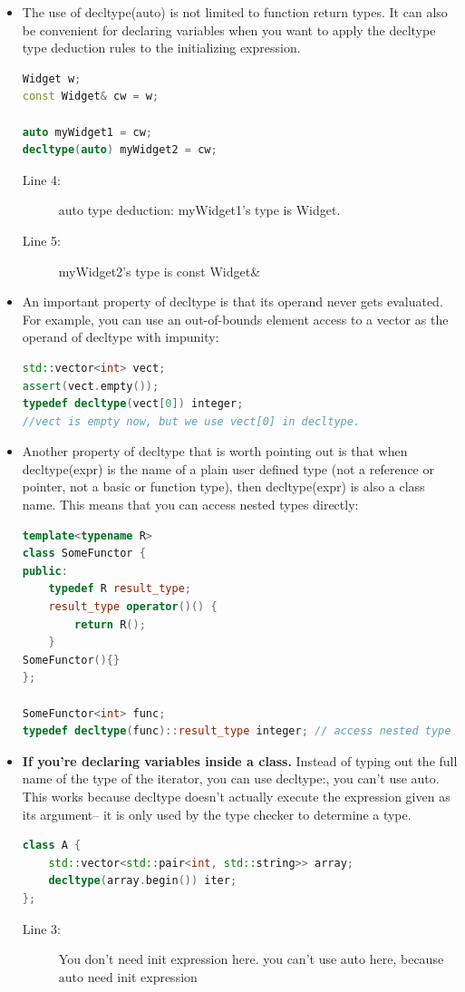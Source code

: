 \documentclass[a4paper,11pt,twoside]{book}
\begin{document}
\begin{itemize}
	\item The use of decltype(auto) is not limited to function return types. It can also be convenient for declaring variables when you want to apply the decltype type deduction rules to the initializing expression.
\begin{lstlisting}[frame=single, language=c++, mathescape=true]
Widget w;
const Widget& cw = w;

auto myWidget1 = cw; 
decltype(auto) myWidget2 = cw;
\end{lstlisting}
\begin{description}
	\item[Line 4:] auto type deduction: myWidget1's type is Widget.
	\item[Line 5:] myWidget2's type is  const Widget\&
\end{description}
	
	\item An important property of decltype is that its operand never gets evaluated. For example, you can use an out-of-bounds element access to a vector as the operand of decltype with impunity:
	
\begin{lstlisting}[frame=single, language=c++, mathescape=true]
std::vector<int> vect;
assert(vect.empty());
typedef decltype(vect[0]) integer; 
//vect is empty now, but we use vect[0] in decltype.
\end{lstlisting}
	
	\item Another property of decltype that is worth pointing out is that when decltype(expr) is the name of a plain user defined type (not a reference or pointer, not a basic or function type), then decltype(expr) is also a class name. This means that you can access nested types directly:
\begin{lstlisting}[frame=single, language=c++, mathescape=true]
template<typename R>
class SomeFunctor {
public:
	typedef R result_type;
	result_type operator()() {
		return R();
	}
SomeFunctor(){}
};

SomeFunctor<int> func;
typedef decltype(func)::result_type integer; // access nested type
\end{lstlisting}
	
	\item  \textbf{If you're declaring variables inside a class.} Instead of typing out the full name of the type of the iterator, you can use decltype:, you can't use auto.  This works because decltype doesn't actually execute the expression given as its argument-- it is only used by the type checker to determine a type.
\begin{lstlisting}[frame=single, language=c++, mathescape=true]
class A {
	std::vector<std::pair<int, std::string>> array;
	decltype(array.begin()) iter; 
};
\end{lstlisting}
\begin{description}
	\item[Line 3:] You don't need init expression here. you can't use auto here, because auto need init expression
\end{description}
	

\end{itemize}
\end{document}
